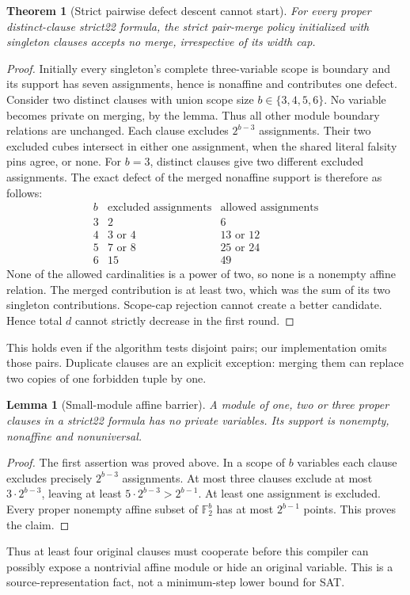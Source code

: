 \documentclass[11pt]{article}
\newtheorem{theorem}{Theorem}
\newtheorem{lemma}{Lemma}
\newcommand{\F}{\mathbb F}
\begin{document}
\begin{theorem}[Strict pairwise defect descent cannot start]
For every proper distinct-clause strict22 formula, the strict pair-merge
policy initialized with singleton clauses accepts no merge, irrespective
of its width cap.
\end{theorem}
\begin{proof}
Initially every singleton's complete three-variable scope is boundary and its
support has seven assignments, hence is nonaffine and contributes one defect.
Consider two distinct clauses with union scope size $b\in\{3,4,5,6\}$.
No variable becomes private on merging, by the lemma. Thus all other module
boundary relations are unchanged. Each clause excludes $2^{b-3}$ assignments.
Their two excluded cubes intersect in either one assignment, when the
shared literal falsity pins agree, or none. For $b=3$, distinct clauses
give two different excluded assignments. The exact defect of the merged
nonaffine support is therefore as follows:
\[
\begin{array}{c|c|c}
b&\text{excluded assignments}&\text{allowed assignments}\\\hline
3&2&6\\
4&3\text{ or }4&13\text{ or }12\\
5&7\text{ or }8&25\text{ or }24\\
6&15&49
\end{array}
\]
None of the allowed cardinalities is a power of two, so none is a nonempty
affine relation. The merged contribution is at least two, which was the
sum of its two singleton contributions. Scope-cap rejection cannot create
a better candidate. Hence total $d$ cannot strictly decrease in the first round.
\end{proof}
This holds even if the algorithm tests disjoint pairs; our implementation
omits those pairs. Duplicate clauses are an explicit exception: merging them
can replace two copies of one forbidden tuple by one.

\begin{lemma}[Small-module affine barrier]
A module of one, two or three proper clauses in a strict22 formula has
no private variables. Its support is nonempty, nonaffine and nonuniversal.
\end{lemma}
\begin{proof}
The first assertion was proved above. In a scope of $b$ variables each
clause excludes precisely $2^{b-3}$ assignments. At most three clauses
exclude at most $3\cdot2^{b-3}$, leaving at least $5\cdot2^{b-3}>2^{b-1}$.
At least one assignment is excluded. Every proper nonempty affine subset
of $\F_2^b$ has at most $2^{b-1}$ points. This proves the claim.
\end{proof}
Thus at least four original clauses must cooperate before this compiler can
possibly expose a nontrivial affine module or hide an original variable.
This is a source-representation fact, not a minimum-step lower bound for SAT.
\end{document}
